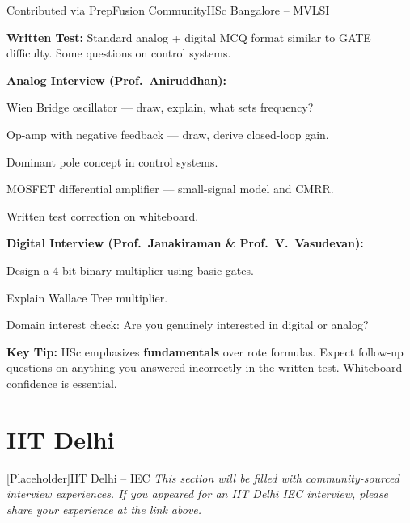 \begin{experience}{Contributed via PrepFusion Community}{IISc Bangalore -- MVLSI}

  \textbf{Written Test:} Standard analog + digital MCQ format similar to GATE
  difficulty. Some questions on control systems.

  \vspace{4pt}
  \textbf{Analog Interview (Prof.\ Aniruddhan):}
  \begin{pfChecklist}
    \item Wien Bridge oscillator --- draw, explain, what sets frequency?
    \item Op-amp with negative feedback --- draw, derive closed-loop gain.
    \item Dominant pole concept in control systems.
    \item MOSFET differential amplifier --- small-signal model and CMRR.
    \item Written test correction on whiteboard.
  \end{pfChecklist}

  \vspace{4pt}
  \textbf{Digital Interview (Prof.\ Janakiraman \& Prof.\ V.\ Vasudevan):}
  \begin{pfChecklist}
    \item Design a 4-bit binary multiplier using basic gates.
    \item Explain Wallace Tree multiplier.
    \item Domain interest check: Are you genuinely interested in digital or analog?
  \end{pfChecklist}

  \textbf{Key Tip:} IISc emphasizes \textbf{fundamentals} over rote formulas.
  Expect follow-up questions on anything you answered incorrectly in the written
  test. Whiteboard confidence is essential.
\end{experience}

\section{IIT Delhi}
\label{sec:exp-iitd}

\begin{experience}{[Placeholder]}{IIT Delhi -- IEC}
  \textit{This section will be filled with community-sourced interview
  experiences. If you appeared for an IIT Delhi IEC interview, please share
  your experience at the link above.}
\end{experience}

